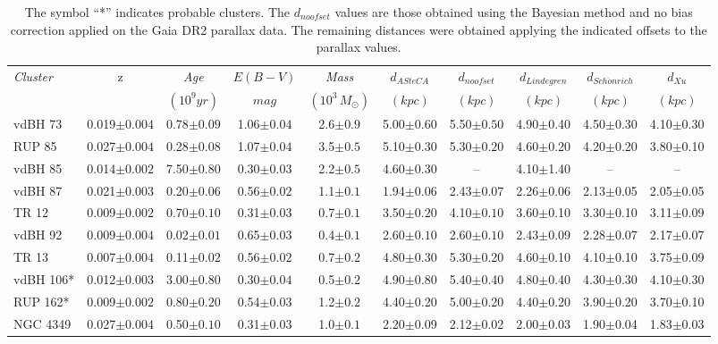 \documentclass[draft]{aa}
\begin{document}
\begin{table}[ht]
\small
\centering
\begin{tabular}{lccccccccc}
\hline
 \emph{Cluster} & z & \emph{Age} & $E(B-V)$ & \emph{Mass} &
 $d_{ASteCA}$ & $d_{noofset}$ & $d_{Lindegren}$ & $d_{Sch\ddot{o}nrich}$ &
 $d_{Xu}$ \\
& & $(10^9 yr)$ & $mag$ & $(10^3\,M_{\odot})$ & $(kpc)$ & $(kpc)$ & $(kpc)$ &
$(kpc)$ & $(kpc)$\\
 \hline\hline
 vdBH 73 & 0.019$\pm0.004$ & 0.78$\pm0.09$ & 1.06$\pm0.04$ & 2.6$\pm0.9$ &
 5.00$\pm0.60$ & 5.50$\pm0.50$ & 4.90$\pm$0.40 & 4.50$\pm$0.30 & 4.10$\pm$0.30\\
 RUP 85 & 0.027$\pm0.004$ & 0.28$\pm0.08$ & 1.07$\pm0.04$ & 3.5$\pm0.5$ &
 5.10$\pm0.30$ & 5.30$\pm0.20$ & 4.60$\pm$0.20 & 4.20$\pm$0.20 & 3.80$\pm$0.10\\
 vdBH 85 & 0.014$\pm0.002$ & 7.50$\pm0.80$ & 0.30$\pm0.03$ & 2.2$\pm0.5$ &
 4.60$\pm0.30$ & -- & 4.10$\pm$1.40 & -- & --\\
 vdBH 87 & 0.021$\pm0.003$ & 0.20$\pm0.06$ & 0.56$\pm0.02$ & 1.1$\pm0.1$ &
 1.94$\pm0.06$ & 2.43$\pm0.07$ & 2.26$\pm$0.06 & 2.13$\pm$0.05 & 2.05$\pm$0.05\\
%
 TR 12 & 0.009$\pm0.002$ & 0.70$\pm0.10$ & 0.31$\pm0.03$ & 0.7$\pm0.1$ &
 3.50$\pm0.20$ & 4.10$\pm0.10$ & 3.60$\pm$0.10 & 3.30$\pm$0.10 & 3.11$\pm$0.09\\
 vdBH 92 & 0.009$\pm0.004$ & 0.02$\pm0.01$ & 0.65$\pm0.03$ & 0.4$\pm0.1$ &
 2.60$\pm0.10$ & 2.60$\pm0.10$ & 2.43$\pm$0.09 & 2.28$\pm$0.07 & 2.17$\pm$0.07\\
 TR 13 & 0.007$\pm0.004$ & 0.11$\pm0.02$ & 0.56$\pm0.02$ & 0.7$\pm0.2$ &
 4.80$\pm0.30$ & 5.30$\pm$0.20 & 4.60$\pm$0.10 & 4.10$\pm$0.10 & 3.75$\pm$0.09\\
 vdBH 106* & 0.012$\pm0.003$ & 3.00$\pm0.80$ & 0.30$\pm0.04$ & 0.5$\pm0.2$ &
 4.90$\pm$0.80 & 5.40$\pm$0.40 & 4.80$\pm$0.40 & 4.30$\pm$0.30 & 4.10$\pm$0.30\\
 RUP 162* & 0.009$\pm0.002$ & 0.80$\pm0.20$ & 0.54$\pm0.03$ & 1.2$\pm0.2$ &
 4.40$\pm$0.20 & 5.00$\pm$0.20 & 4.40$\pm$0.20 & 3.90$\pm$0.20 & 3.70$\pm$0.10\\
 NGC 4349 & 0.027$\pm0.004$ & 0.50$\pm0.10$ & 0.31$\pm0.03$ & 1.0$\pm0.1$ &
 2.20$\pm$0.09 & 2.12$\pm$0.02 & 2.00$\pm$0.03 & 1.90$\pm$0.04 & 1.83$\pm$0.03\\
\hline
\end{tabular}
\caption{The symbol ``*'' indicates probable clusters. The $d_{noofset}$ values
are those obtained using the Bayesian method and no bias correction applied on
the Gaia DR2 parallax data. The remaining distances were obtained applying the
indicated offsets to the parallax values.}
\label{tab:final_tab}
\end{table}
\end{document}
